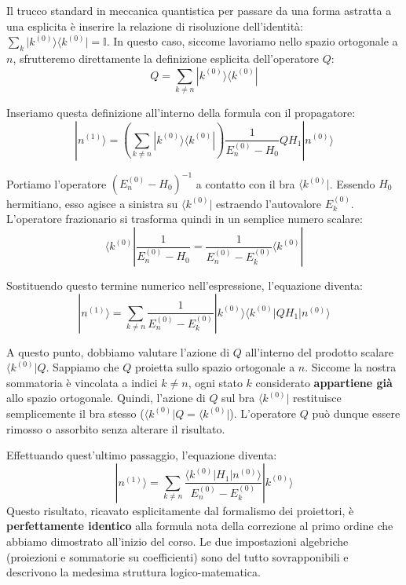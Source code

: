 Il trucco standard in meccanica quantistica per passare da una forma astratta a una esplicita è inserire la relazione di risoluzione dell'identità: $\sum_k \vert{}k^{(0)}\rangle \langle k^{(0)}\vert{} = \mathbb{I}$.
In questo caso, siccome lavoriamo nello spazio ortogonale a $n$, sfrutteremo direttamente la definizione esplicita dell'operatore $Q$:
\begin{equation}
Q = \sum_{k \neq n} |k^{(0)}\rangle \langle k^{(0)}|
\end{equation}

Inseriamo questa definizione all'interno della formula con il propagatore:
\begin{equation}
|n^{(1)}\rangle = \left( \sum_{k \neq n} |k^{(0)}\rangle \langle k^{(0)}| \right) \frac{1}{E_n^{(0)} - H_0} Q H_1 |n^{(0)}\rangle
\end{equation}

Portiamo l'operatore $(E_n^{(0)} - H_0)^{-1}$ a contatto con il bra $\langle k^{(0)}\vert{}$. Essendo $H_0$ hermitiano, esso agisce a sinistra su $\langle k^{(0)}\vert{}$ estraendo l'autovalore $E_k^{(0)}$. L'operatore frazionario si trasforma quindi in un semplice numero scalare:
\begin{equation}
\langle k^{(0)} | \frac{1}{E_n^{(0)} - H_0} = \frac{1}{E_n^{(0)} - E_k^{(0)}} \langle k^{(0)} |
\end{equation}

Sostituendo questo termine numerico nell'espressione, l'equazione diventa:
\begin{equation}
|n^{(1)}\rangle = \sum_{k \neq n} \frac{1}{E_n^{(0)} - E_k^{(0)}} |k^{(0)}\rangle \langle k^{(0)} | Q H_1 |n^{(0)}\rangle
\end{equation}

A questo punto, dobbiamo valutare l'azione di $Q$ all'interno del prodotto scalare $\langle k^{(0)} \vert{} Q$. Sappiamo che $Q$ proietta sullo spazio ortogonale a $n$. Siccome la nostra sommatoria è vincolata a indici $k \neq n$, ogni stato $k$ considerato \textbf{appartiene già} allo spazio ortogonale. Quindi, l'azione di $Q$ sul bra $\langle k^{(0)}\vert{}$ restituisce semplicemente il bra stesso ($\langle k^{(0)} \vert{} Q = \langle k^{(0)} \vert{}$). L'operatore $Q$ può dunque essere rimosso o assorbito senza alterare il risultato.

Effettuando quest'ultimo passaggio, l'equazione diventa:
\begin{equation}
|n^{(1)}\rangle = \sum_{k \neq n} \frac{\langle k^{(0)} | H_1 | n^{(0)} \rangle}{E_n^{(0)} - E_k^{(0)}} |k^{(0)}\rangle
\end{equation}
Questo risultato, ricavato esplicitamente dal formalismo dei proiettori, è \textbf{perfettamente identico} alla formula nota della correzione al primo ordine che abbiamo dimostrato all'inizio del corso. Le due impostazioni algebriche (proiezioni e sommatorie su coefficienti) sono del tutto sovrapponibili e descrivono la medesima struttura logico-matematica.

